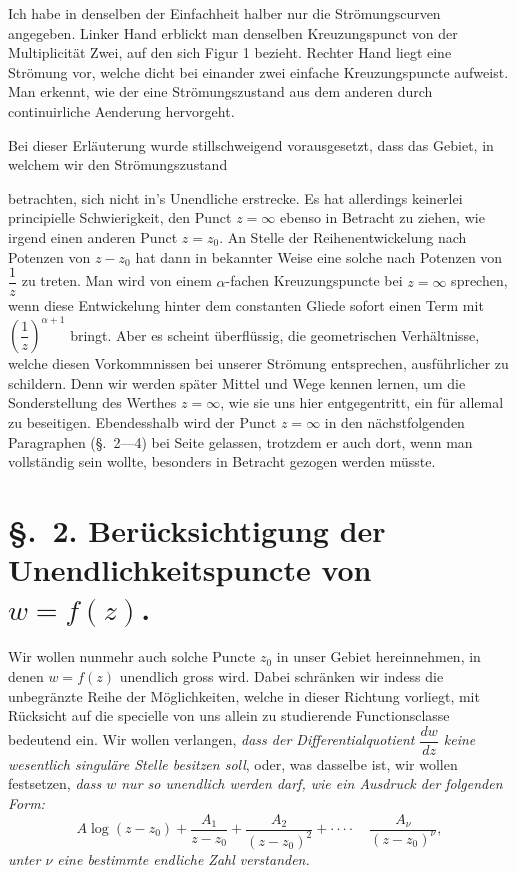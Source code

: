 \documentclass{article}
\begin{document}
Ich habe in denselben der Einfachheit halber nur die Strömungscurven angegeben. Linker Hand erblickt man denselben Kreuzungspunct von der Multiplicität Zwei, auf den sich Figur 1 bezieht. Rechter Hand liegt eine Strömung vor, welche dicht bei einander zwei einfache Kreuzungspuncte aufweist. Man erkennt, wie der eine Strömungszustand aus dem anderen durch continuirliche Aenderung hervorgeht.

Bei dieser Erläuterung wurde stillschweigend vorausgesetzt, dass das Gebiet, in welchem wir den Strömungszustand

betrachten, sich nicht in's Unendliche erstrecke. Es hat allerdings keinerlei principielle Schwierigkeit, den Punct $z = \infty$ ebenso in Betracht zu ziehen, wie irgend einen anderen Punct $z = z_{0}$. An Stelle der Reihenentwickelung nach Potenzen von $z - z_{0}$ hat dann in bekannter Weise eine solche nach Potenzen von $\dfrac{1}{z}$ zu treten. Man wird von einem $\alpha$-fachen Kreuzungspuncte bei $z = \infty$ sprechen, wenn diese Entwickelung hinter dem constanten Gliede sofort einen Term mit $\left(\dfrac{1}{z}\right)^{\alpha+1}$ bringt. Aber es scheint überflüssig, die geometrischen Verhältnisse, welche diesen Vorkommnissen bei unserer Strömung entsprechen, ausführlicher zu schildern. Denn wir werden später Mittel und Wege kennen lernen, um die Sonderstellung des Werthes $z = \infty$, wie sie uns hier entgegentritt, ein für allemal zu beseitigen. Ebendesshalb wird der Punct $z = \infty$ in den nächstfolgenden Paragraphen (§.~2---4) bei Seite gelassen, trotzdem er auch dort, wenn man vollständig sein wollte, besonders in Betracht gezogen werden müsste.

\section*{§.~2. Berücksichtigung der Unendlichkeitspuncte von $w = f(z)$.}

Wir wollen nunmehr auch solche Puncte $z_{0}$ in unser Gebiet hereinnehmen, in denen $w = f(z)$ unendlich gross wird. Dabei schränken wir indess die unbegränzte Reihe der Möglichkeiten, welche in dieser Richtung vorliegt, mit Rücksicht auf die specielle von uns allein zu studierende Functionsclasse bedeutend ein. Wir wollen verlangen, \emph{dass der Differentialquotient $\dfrac{dw}{dz}$ keine wesentlich singuläre Stelle besitzen soll}, oder, was dasselbe ist, wir wollen festsetzen, \emph{dass $w$ nur so unendlich werden darf, wie ein Ausdruck der folgenden Form:}
\[ A \log (z - z_{0}) + \frac{A_{1}}{z - z_{0}} + \frac{A_{2}}{(z - z_{0})^{2}} + \cdot\cdot\cdot\cdot \quad \frac{A_{\nu}}{(z - z_{0})^{\nu}}, \]
\emph{unter $\nu$ eine bestimmte endliche Zahl verstanden.}
\end{document}
